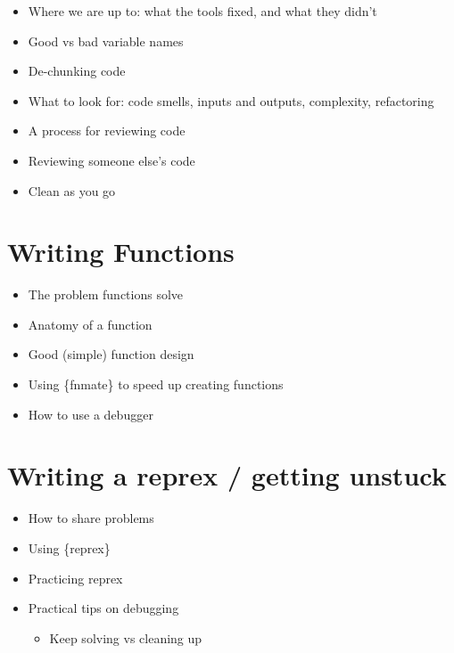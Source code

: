 \documentclass[
  letterpaper,
  justified,
  a4paper]{tufte-book}
\providecommand{\tightlist}{%
  \setlength{\itemsep}{0pt}\setlength{\parskip}{0pt}}
\providecommand{\tightlist}{%
  \setlength{\itemsep}{0pt}\setlength{\parskip}{0pt}}
\begin{document}

\begin{itemize}
\tightlist
\item
  Where we are up to: what the tools fixed, and what they didn't
\item
  Good vs bad variable names
\item
  De-chunking code
\item
  What to look for: code smells, inputs and outputs, complexity,
  refactoring
\item
  A process for reviewing code
\item
  Reviewing someone else's code
\item
  Clean as you go
\end{itemize}

\section*{Writing Functions}\label{writing-functions}


\begin{itemize}
\tightlist
\item
  The problem functions solve
\item
  Anatomy of a function
\item
  Good (simple) function design
\item
  Using \{fnmate\} to speed up creating functions
\item
  How to use a debugger
\end{itemize}

\section*{Writing a reprex / getting
unstuck}\label{writing-a-reprex-getting-unstuck}


\begin{itemize}
\tightlist
\item
  How to share problems
\item
  Using \{reprex\}
\item
  Practicing reprex
\item
  Practical tips on debugging

  \begin{itemize}
  \tightlist
  \item
    Keep solving vs cleaning up
  \end{itemize}
\end{itemize}
\end{document}
